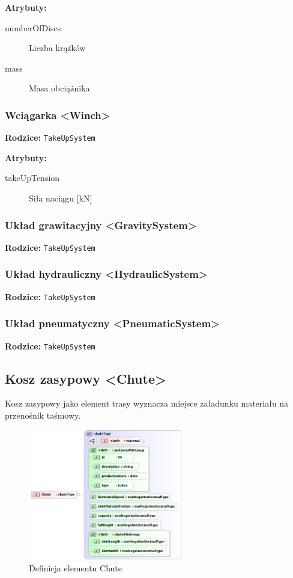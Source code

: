 \documentclass[12pt,a4paper]{article}
\begin{document}
\noindent\textbf{Atrybuty:}
\begin{description}
\item[numberOfDiscs] Liczba krążków
\item[mass] Masa obciążnika
\end{description}


\subsubsection{Wciągarka <Winch>}

\noindent\textbf{Rodzice:} \texttt{TakeUpSystem}

\noindent\textbf{Atrybuty:}
\begin{description}
\item[takeUpTension] Siła naciągu [kN]
\end{description}


\subsubsection{Układ grawitacyjny <GravitySystem>}

\noindent\textbf{Rodzice:} \texttt{TakeUpSystem}


\subsubsection{Układ hydrauliczny <HydraulicSystem>}

\noindent\textbf{Rodzice:} \texttt{TakeUpSystem}


\subsubsection{Układ pneumatyczny <PneumaticSystem>}

\noindent\textbf{Rodzice:} \texttt{TakeUpSystem}

\subsection{Kosz zasypowy <Chute>}
Kosz zasypowy jako element trasy wyznacza miejsce załadunku materiału na
przenośnik taśmowy.

\begin{figure}[H]
  \centering
  \includegraphics[width=0.6\textwidth]{png/liquid/Chute}
  \caption{Definicja elementu Chute}
  \label{fig:chute-xsd}
\end{figure}
\end{document}
